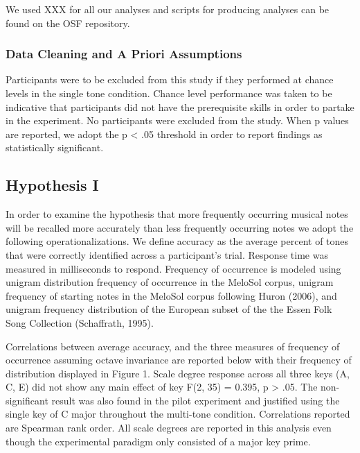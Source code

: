 \documentclass[english,man]{apa6}
\begin{document}
We used XXX for all our analyses and scripts for producing analyses can be found on the OSF repository.

\hypertarget{data-cleaning-and-a-priori-assumptions}{%
\subsubsection{Data Cleaning and A Priori Assumptions}\label{data-cleaning-and-a-priori-assumptions}}

Participants were to be excluded from this study if they performed at chance levels in the single tone condition.
Chance level performance was taken to be indicative that participants did not have the prerequisite skills in order to partake in the experiment.
No participants were excluded from the study. When p values are reported, we adopt the p \textless{} .05 threshold in order to report findings as statistically significant.

\hypertarget{hypothesis-i}{%
\subsection{Hypothesis I}\label{hypothesis-i}}

In order to examine the hypothesis that more frequently occurring musical notes will be recalled more accurately than less frequently occurring notes we adopt the following operationalizations.
We define accuracy as the average percent of tones that were correctly identified across a participant's trial.
Response time was measured in milliseconds to respond.
Frequency of occurrence is modeled using unigram distribution frequency of occurrence in the MeloSol corpus, unigram frequency of starting notes in the MeloSol corpus following Huron (2006), and unigram frequency distribution of the European subset of the the Essen Folk Song Collection (Schaffrath, 1995).

Correlations between average accuracy, and the three measures of frequency of occurrence assuming octave invariance are reported below with their frequency of distribution displayed in Figure 1.
Scale degree response across all three keys (A, C, E) did not show any main effect of key F(2, 35) = 0.395, p \textgreater{} .05.
The non-significant result was also found in the pilot experiment and justified using the single key of C major throughout the multi-tone condition.
Correlations reported are Spearman rank order.
All scale degrees are reported in this analysis even though the experimental paradigm only consisted of a major key prime.
\end{document}

